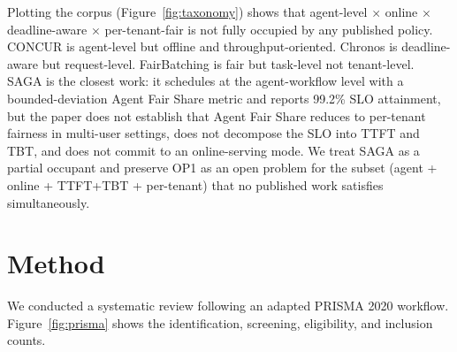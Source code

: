 \documentclass[10pt]{article} %
\theoremstyle{definition}
\begin{document}
Plotting the corpus (Figure~\ref{fig:taxonomy}) shows that
agent-level $\times$ online $\times$ deadline-aware $\times$
per-tenant-fair is not fully occupied by any published policy.
CONCUR is agent-level but offline and throughput-oriented. Chronos
is deadline-aware but request-level. FairBatching is fair but
task-level not tenant-level. SAGA
\citep{guo2026saga} is the closest work: it schedules at the
agent-workflow level with a bounded-deviation Agent Fair Share
metric and reports 99.2\% SLO attainment, but the paper does not
establish that Agent Fair Share reduces to per-tenant fairness in
multi-user settings, does not decompose the SLO into TTFT and TBT,
and does not commit to an online-serving mode. We treat SAGA as a
partial occupant and preserve OP1 as an open problem for the
subset (agent + online + TTFT+TBT + per-tenant) that no published
work satisfies simultaneously.

\section{Method}
\label{sec:method}

We conducted a systematic review following an adapted PRISMA 2020
workflow. Figure~\ref{fig:prisma} shows the identification,
screening, eligibility, and inclusion counts.
\end{document}
